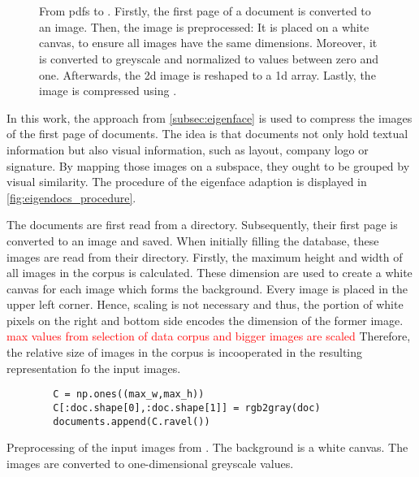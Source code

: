 \section{\eigendocs{}}\label{subsec:eigendocs}

\begin{figure}[htp] %
    \centering
    
    \caption{From \acp{pdf} to \eigendocs{}.
    Firstly, the first page of a document is converted to an image.
    Then, the image is preprocessed:
    It is placed on a white canvas, to ensure all images have the same dimensions.
    Moreover, it is converted to greyscale and normalized to values between zero and one.
    Afterwards, the 2d image is reshaped to a 1d array.
    Lastly, the image is compressed using \eigendocs{}.
    }
    \label{fig:eigendocs_procedure}
\end{figure}

In this work, the \eigenfaces{} approach from \autoref{subsec:eigenface} is used to compress the images of the first page of documents.
The idea is that documents not only hold textual information but also visual information, such as layout, company logo or signature.
By mapping those images on a subspace, they ought to be grouped by visual similarity.
The procedure of the eigenface adaption \textit{\eigendocs{}} is displayed in \autoref{fig:eigendocs_procedure}.

The documents are first read from a directory. 
Subsequently, their first page is converted to an image and saved.
When initially filling the database, these images are read from their directory.
Firstly, the maximum height and width of all images in the corpus is calculated.
These dimension are used to create a white canvas for each image which forms the background.
Every image is placed in the upper left corner.
Hence, scaling is not necessary and thus, the portion of white pixels on the right and bottom side encodes the dimension of the former image.
\textcolor{red}{max values from selection of data corpus and bigger images are scaled}
Therefore, the relative size of images in the corpus is incooperated in the resulting representation fo the input images.

\begin{listing}[htp]
    \begin{verbatim}
        C = np.ones((max_w,max_h))
        C[:doc.shape[0],:doc.shape[1]] = rgb2gray(doc)
        documents.append(C.ravel())
    \end{verbatim}
    \caption{Preprocessing of the input images from \thesissupervisor{}.
    The background is a white canvas.
    The images are converted to one-dimensional greyscale values.}
    \label{lst:preproc_images}
\end{listing}


